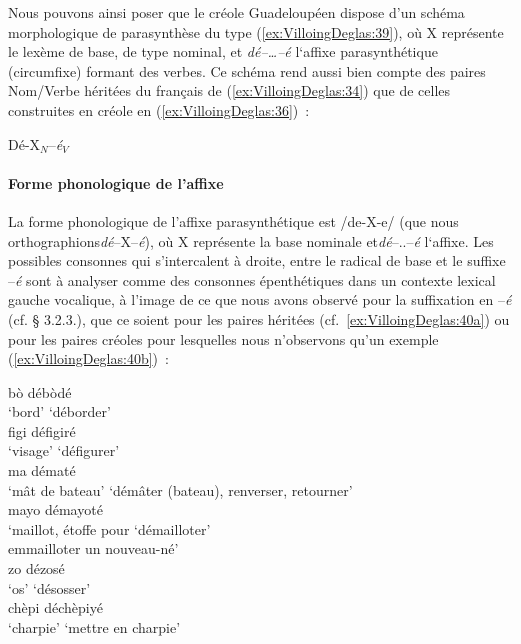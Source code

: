 \documentclass[output=paper]{langsci/langscibook}
\begin{document}
Nous pouvons ainsi poser que le créole Guadeloupéen dispose d'un schéma
morphologique de parasynthèse du type (\ref{ex:VilloingDeglas:39}), où X représente le lexème de
base, de type nominal, et \emph{dé--\ldots{}--\emph{é}} l`affixe parasynthétique
(circumfixe) formant des verbes. Ce schéma rend aussi bien compte des
paires Nom/Verbe héritées du français de (\ref{ex:VilloingDeglas:34}) que de celles construites
en créole en (\ref{ex:VilloingDeglas:36})~:

\ea \label{ex:VilloingDeglas:39} Dé-X$_{N}$--\emph{é}$_{V}$ 
\z

\paragraph{Forme phonologique de l'affixe
}\label{forme-phonologique-de-laffixe}

La forme phonologique de l'affixe parasynthétique est /de-X-e/ (que nous
orthographions\emph{dé}--X--\emph{é}), où X représente la base nominale et\emph{dé}--..--\emph{é}
l`affixe. Les possibles consonnes qui s'intercalent à droite, entre le
radical de base et le suffixe --\emph{é} sont à analyser comme des
consonnes épenthétiques dans un contexte lexical gauche vocalique, à
l'image de ce que nous avons observé pour la suffixation en --\emph{é}
(cf. § 3.2.3.), que ce soient pour les paires héritées (cf.~\ref{ex:VilloingDeglas:40a}) ou
pour les paires créoles pour lesquelles nous n'observons qu'un exemple
(\ref{ex:VilloingDeglas:40b})~:

\ea \label{ex:VilloingDeglas:40}
      \ea\label{ex:VilloingDeglas:40a}
            \ea \gll  bò \textrightarrow{} débòdé\\
              {`bord'} {} {`déborder'}\\
            \ex \gll  figi \textrightarrow{} défigiré\\
              {`visage'} {} {`défigurer'}\\
            \ex \gll  ma \textrightarrow{} dématé\\
              {`mât de bateau'} {} {`démâter (bateau), renverser, retourner'}\\
            \ex \glll  mayo  \textrightarrow{} démayoté\\
             {`maillot, étoffe pour} {} `démailloter'\\
             {emmailloter un nouveau-né'} {} {} \\
            \ex \gll  zo \textrightarrow{} dézosé\\
              {`os'} {} {`désosser'}\\
            \z
      \ex\label{ex:VilloingDeglas:40b} \gll  chèpi \textrightarrow{} déchèpiyé\\
        {`charpie'} {} {`mettre en charpie'}\\
      \z
\z
\end{document}
